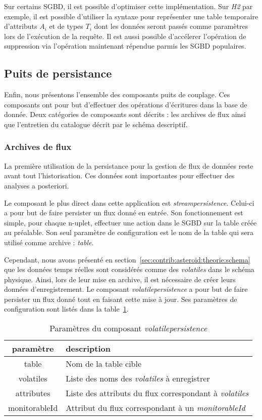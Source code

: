 Sur certains SGBD, il est possible d'optimiser cette implémentation. Sur \textit{H2} par exemple, il est possible d'utiliser la syntaxe  pour représenter une table temporaire d'attributs $A_i$ et de types $T_i$ dont les données seront passés comme paramètres lors de l'exécution de la requête. Il est aussi possible d'accélerer l'opération de suppression via l'opération  maintenant répendue parmis les SGBD populaires.

\subsection{Puits de persistance}
Enfin, nous présentons l'ensemble des composants puits de couplage. Ces composants ont pour but d'effectuer des opérations d'écritures dans la base de donnée. Deux catégories de composants sont décrits : les archives de flux ainsi que l'entretien du catalogue décrit par le schéma descriptif.
\subsubsection{Archives de flux}
La première utilisation de la persistance pour la gestion de flux de données reste avant tout l'historisation. Ces données sont importantes pour effectuer des analyses a posteriori.

Le composant le plus direct dans cette application est \textit{streampersistence}. Celui-ci a pour but de faire persister un flux donné en entrée. Son fonctionnement est simple, pour chaque n-uplet, effectuer une action  dans le SGBD sur la table créée au préalable. Son seul paramètre de configuration est le nom de la table qui sera utilisé comme archive : \textit{table}.

Cependant, nous avons présenté en section~\ref{sec:contrib:asteroid:theorie:schema} que les données temps réelles sont considérés comme des \textit{volatiles} dans le schéma physique. Ainsi, lors de leur mise en archive, il est nécessaire de créer leurs données d'enregistrement. Le composant \textit{volatilepersistence} a pour but de faire persister un flux donné tout en faisant cette mise à jour. Ses paramètres de configuration sont listés dans la table~\ref{tab:contrib:asteroid:volatilepersistence}.

\begin{table}[ht]
    \centering
    \begin{tabular}{cl}
        paramètre & description \\ \midrule
        table & Nom de la table cible\\
        volatiles & Liste des noms des \textit{volatiles} à enregistrer\\
        attributes & Liste des attributs du flux correspondant à \textit{volatiles}\\
        monitorableId & Attribut du flux correspondant à un \textit{monitorableId}
    \end{tabular}
    \caption{Paramètres du composant \textit{volatilepersistence}}\label{tab:contrib:asteroid:volatilepersistence}
\end{table}

